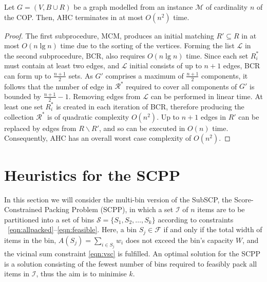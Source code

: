 \documentclass[authoryear]{elsarticle}
\begin{document}
\begin{theorem}
	\label{thm:ahc}
	Let $G=(V, B \cup R)$ be a graph modelled from an instance $\mathcal{M}$ of cardinality $n$ of the COP. Then, AHC terminates in at most $O(n^2)$ time.
\end{theorem}

\begin{proof}
	The first subprocedure, MCM, produces an initial matching $R' \subseteq R$ in at most $O(n \lg n)$ time due to the sorting of the vertices. Forming the list $\mathcal{L}$ in the second subprocedure, BCR, also requires $O(n \lg n)$ time. Since each set $R^*_i$ must contain at least two edges, and $\mathcal{L}$ initial consists of up to $n+1$ edges, BCR can form up to $\frac{n+1}{2}$ sets. As $G'$ comprises a maximum of $\frac{n+1}{2}$ components, it follows that the number of edge in $\mathcal{R}^*$ required to cover all components of $G'$  is bounded by $\frac{n+1}{2}-1$. Removing edges from $\mathcal{L}$ can be performed in linear time. At least one set $R^*_i$ is created in each iteration of BCR, therefore producing the collection $\mathcal{R}^*$ is of quadratic complexity $O(n^2)$. Up to $n+1$ edges in $R'$ can be replaced by edges from $R\backslash R'$, and so can be executed in $O(n)$ time. Consequently, AHC has an overall worst case complexity of $O(n^2)$.
\end{proof}	

\section{Heuristics for the SCPP}
\label{sec:heur}

\noindent In this section we will consider the multi-bin version of the SubSCP, the Score-Constrained Packing Problem (SCPP), in which a set $\mathcal{I}$ of $n$ items are to be partitioned into a set of bins $\mathcal{S} = \{S_1, S_2,\dotsc,S_k\}$ according to constraints ~\eqref{eqn:allpacked}--\eqref{eqn:feasible}. Here, a bin $S_j \in \mathcal{F}$ if and only if the total width of items in the bin, $A(S_j) = \sum_{i \in S_j} w_i$ does not exceed the bin's capacity $W$, and the vicinal sum constraint \eqref{eqn:vsc} is fulfilled. An optimal solution for the SCPP is a solution consisting of the fewest number of bins required to feasibly pack all items in $\mathcal{I}$, thus the aim is to minimise $k$.
\end{document}
